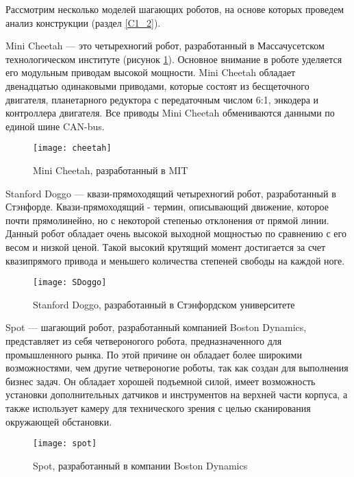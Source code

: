 Рассмотрим несколько моделей шагающих роботов, на основе которых проведем анализ конструкции (раздел \ref{C1_2}).

Mini Cheetah \cite{cheetah} --- это четырехногий робот, разработанный в Массачусетском технологическом институте (рисунок \ref{cheetah}). Основное внимание в роботе уделяется его модульным приводам высокой мощности. Mini Cheetah обладает двенадцатью одинаковыми приводами, которые состоят из бесщеточного двигателя, планетарного редуктора с передаточным числом 6:1, энкодера и контроллера двигателя. Все приводы Mini Cheetah обмениваются данными по единой шине CAN-bus.
\begin{figure}[h!]
	\begin{center}
		\texttt{[image: cheetah]}
		\caption{Mini Cheetah, разработанный в MIT}
		\label{cheetah}
	\end{center}
\end{figure}

Stanford Doggo\cite{SDoggo} --- квази-прямоходящий четырехногий робот, разработанный в Стэнфорде. Квази-прямоходящий - термин, описывающий движение, которое почти прямолинейно, но с некоторой степенью отклонения от прямой линии. Данный робот обладает очень высокой выходной мощностью по сравнению с его весом и низкой ценой. Такой высокий крутящий момент достигается за счет квазипрямого привода и меньшего количества степеней свободы на каждой ноге.
\newpage
\begin{figure}[h!]
	\begin{center}
		\texttt{[image: SDoggo]}
		\caption{Stanford Doggo, разработанный в Стэнфордском университете}
		\label{SDoggo}
	\end{center}
\end{figure}

Spot\cite{spot} --- шагающий робот, разработанный компанией Boston Dynamics, представляет из себя четвероногого робота, предназначенного для промышленного рынка. По этой причине он обладает более широкими возможностями, чем другие четвероногие роботы, так как создан для выполнения бизнес задач. Он обладает хорошей подъемной силой, имеет возможность установки дополнительных датчиков и инструментов на верхней части корпуса, а также использует камеру для технического зрения с целью сканирования окружающей обстановки.%
\begin{figure}[h!]
	\begin{center}
		\texttt{[image: spot]}
		\caption{Spot, разработанный в компании Boston Dynamics}
		\label{spot}
	\end{center}
\end{figure}


